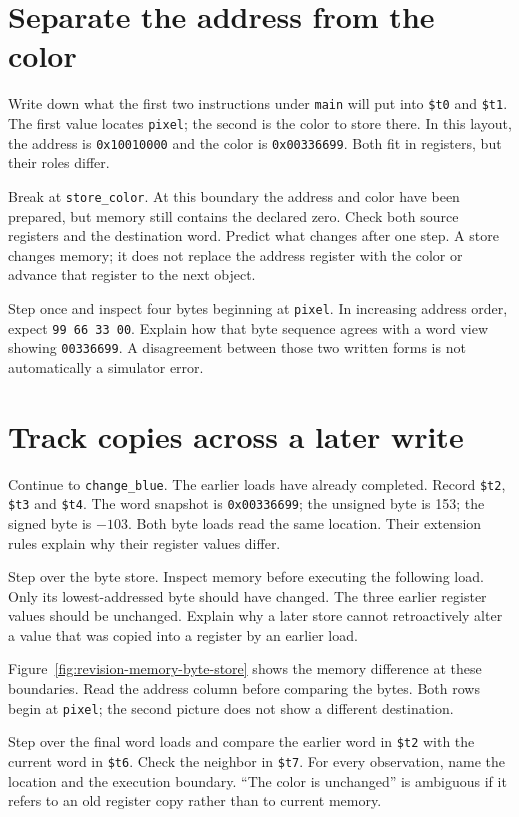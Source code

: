 \section{Separate the address from the color}

Write down what the first two instructions under \texttt{main} will put into
\texttt{\$t0} and \texttt{\$t1}. The first value locates \texttt{pixel}; the second
is the color to store there. In this layout, the address is
\texttt{0x10010000} and the color is \texttt{0x00336699}. Both fit in registers,
but their roles differ.

Break at \texttt{store\_color}. At this boundary the address and color have been
prepared, but memory still contains the declared zero. Check both source registers
and the destination word. Predict what changes after one step. A store changes
memory; it does not replace the address register with the color or advance that
register to the next object.

Step once and inspect four bytes beginning at \texttt{pixel}. In increasing
address order, expect \texttt{99 66 33 00}. Explain how that byte sequence agrees
with a word view showing \texttt{00336699}. A disagreement between those two
written forms is not automatically a simulator error.

\section{Track copies across a later write}

Continue to \texttt{change\_blue}. The earlier loads have already completed.
Record \texttt{\$t2}, \texttt{\$t3} and \texttt{\$t4}. The word snapshot is
\texttt{0x00336699}; the unsigned byte is 153; the signed byte is $-103$.
Both byte loads read the same location. Their extension rules explain why their
register values differ.

Step over the byte store. Inspect memory before executing the following load.
Only its lowest-addressed byte should have changed. The three earlier register
values should be unchanged. Explain why a later store cannot retroactively alter
a value that was copied into a register by an earlier load.

Figure~\ref{fig:revision-memory-byte-store} shows the memory difference at these
boundaries. Read the address column before comparing the bytes. Both rows begin
at \texttt{pixel}; the second picture does not show a different destination.


Step over the final word loads and compare the earlier word in \texttt{\$t2}
with the current word in \texttt{\$t6}. Check the neighbor in \texttt{\$t7}.
For every observation, name the location and the execution boundary. ``The color
is unchanged'' is ambiguous if it refers to an old register copy rather than to
current memory.

